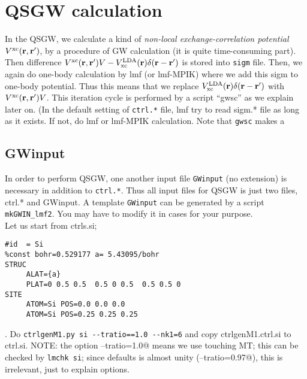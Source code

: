 \documentclass[a4paper,10pt,epsf,fleqn]{article}
\begin{document}
\section{QSGW calculation}
In the QSGW, we calculate a kind of
{\it non-local exchange-correlation potential} $V^{\rm xc}({\bf r},{\bf r}')$,
by a procedure of GW calculation (it is quite time-consuming part).
Then difference $V^{\rm xc}({\bf r},{\bf r}')V-V_{\rm xc}^{\rm
LDA}({\bf r})\delta({\bf r}-{\bf r}')$  is stored into \verb+sigm+ file. 
Then, we again do one-body calculation by lmf (or lmf-MPIK) where we add
this sigm to one-body potential. Thus this means that
we replace $V_{\rm xc}^{\rm LDA}({\bf r})\delta({\bf r}-{\bf r}')$ 
with $V^{\rm xc}({\bf r},{\bf r}')V$.
This iteration cycle is performed by a script ``gwsc'' as we
explain later on. (In the default setting of \verb+ctrl.*+ file, lmf try
to read sigm.* file as long as it exists. If not, do lmf or lmf-MPIK calculation.
Note that \verb+gwsc+ makes a 

\subsection{GWinput}
\label{GWinput}
In order to perform QSGW, one another input file 
\verb+GWinput+ (no extension) is necessary in addition to \verb+ctrl.*+.
Thus all input files for QSGW is just two files, ctrl.* and GWinput.
A template \verb+GWinput+ can be generated by a script \verb+mkGWIN_lmf2+. 
You may have to modify it in cases for your purpose.\\

Let us start from ctrls.si;
\begin{verbatim}
#id  = Si
%const bohr=0.529177 a= 5.43095/bohr
STRUC
     ALAT={a} 
     PLAT=0 0.5 0.5  0.5 0 0.5  0.5 0.5 0 
SITE
     ATOM=Si POS=0.0 0.0 0.0
     ATOM=Si POS=0.25 0.25 0.25
\end{verbatim}
. Do \verb+ctrlgenM1.py si --tratio==1.0 --nk1=6+ and copy ctrlgenM1.ctrl.si to
ctrl.si. {\small NOTE: the option \verb@--tratio=1.0@ means we use touching MT; 
this can be checked by \verb+lmchk si+; since defaults is almost unity 
(\verb@--tratio=0.97@), this is irrelevant, just to explain options.} 
\end{document}
